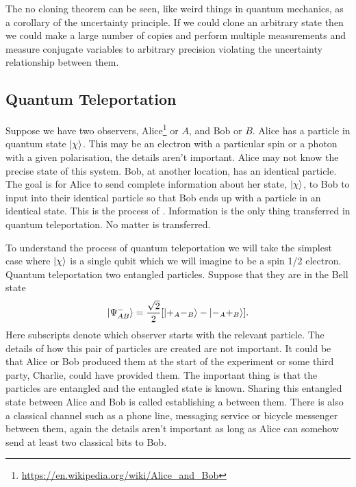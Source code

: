     The no cloning theorem can be seen, like weird things in quantum mechanics, as a corollary of the uncertainty principle.
    If we could clone an arbitrary state then we could make a large number of copies and perform multiple measurements and measure conjugate variables to arbitrary precision violating the uncertainty relationship between them.
    
    \subsection{Quantum Teleportation}
    Suppose we have two observers, Alice\footnote{\url{https://en.wikipedia.org/wiki/Alice_and_Bob}} or \(A\), and Bob or \(B\).
    Alice has a particle in quantum state \(\vert {\chi} \rangle\).
    This may be an electron with a particular spin or a photon with a given polarisation, the details aren't important.
    Alice may not know the precise state of this system.
    Bob, at another location, has an identical particle.
    The goal is for Alice to send complete information about her state, \(\vert {\chi} \rangle\), to Bob to input into their identical particle so that Bob ends up with a particle in an identical state.
    This is the process of .
    Information is the only thing transferred in quantum teleportation.
    No matter is transferred.
    
    To understand the process of quantum teleportation we will take the simplest case where \(\vert {\chi} \rangle\) is a single qubit which we will imagine to be a spin 1/2 electron.
    Quantum teleportation two entangled particles.
    Suppose that they are in the Bell state
    \[\vert {\Psi^-_{AB}} \rangle = \frac{\sqrt{2}}{2}[\vert {+_A-_B} \rangle - \vert {{-_A}{+_B}} \rangle].\]
    Here subscripts denote which observer starts with the relevant particle.
    The details of how this pair of particles are created are not important.
    It could be that Alice or Bob produced them at the start of the experiment or some third party, Charlie, could have provided them.
    The important thing is that the particles are entangled and the entangled state is known.
    Sharing this entangled state between Alice and Bob is called establishing a  between them.
    There is also a classical channel such as a phone line, messaging service or bicycle messenger between them, again the details aren't important as long as Alice can somehow send at least two classical bits to Bob.
    
